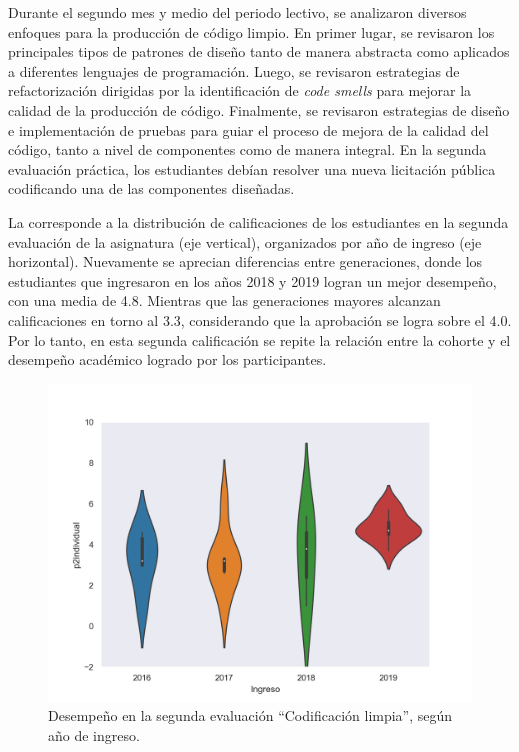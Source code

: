 \documentclass[spanish]{textolivre}
\begin{document}
Durante el segundo mes y medio del periodo lectivo, se analizaron diversos enfoques para la producción de código limpio. En primer lugar, se revisaron los principales tipos de patrones de diseño tanto de manera abstracta como aplicados a diferentes lenguajes de programación. Luego, se revisaron estrategias de refactorización dirigidas por la identificación de \textit{code smells} para mejorar la calidad de la producción de código. Finalmente, se revisaron estrategias de diseño e implementación de pruebas para guiar el proceso de mejora de la calidad del código, tanto a nivel de componentes como de manera integral. En la segunda evaluación práctica, los estudiantes debían resolver una nueva licitación pública codificando una de las componentes diseñadas. 

La  corresponde a la distribución de calificaciones de los estudiantes en la segunda evaluación de la asignatura (eje vertical), organizados por año de ingreso (eje horizontal). Nuevamente se aprecian diferencias entre generaciones, donde los estudiantes que ingresaron en los años 2018 y 2019 logran un mejor desempeño, con una media de 4.8. Mientras que las generaciones mayores alcanzan calificaciones en torno al 3.3, considerando que la aprobación se logra sobre el 4.0. Por lo tanto, en esta segunda calificación se repite la relación entre la cohorte y el desempeño académico logrado por los participantes.

\begin{figure}[H]
\centering
\begin{minipage}{.75\textwidth}
 \includegraphics[width=\textwidth]{figuras/figura3.png}
 \caption{Desempeño en la segunda evaluación “Codificación limpia”, según año de ingreso.}
 \label{fig-eval2}
\end{minipage}
\end{figure}
\end{document}
